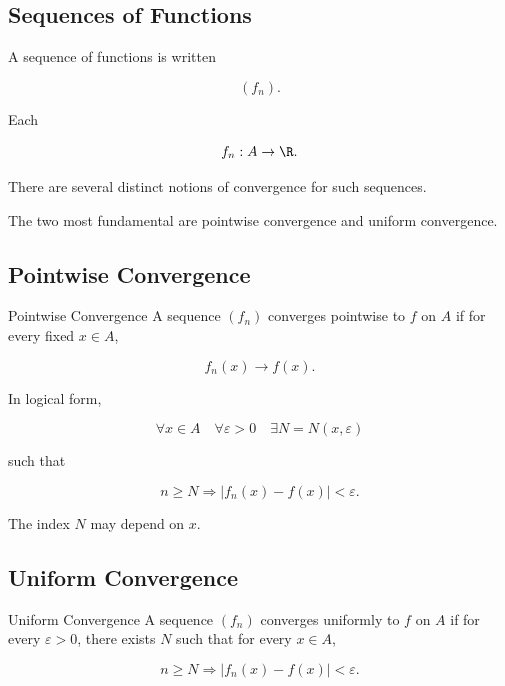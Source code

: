 \subsection{Sequences of Functions}
\label{subsec:sequences-functions}

A sequence of functions is written

\[
\boxed{
(f_n).
}
\]

Each

\[
f_n:A\to\R.
\]

There are several distinct notions of convergence for such sequences.

The two most fundamental are pointwise convergence and uniform convergence.

\subsection{Pointwise Convergence}
\label{subsec:pointwise-convergence}

\begin{definitionbox}{Pointwise Convergence}
A sequence \((f_n)\) converges pointwise to \(f\) on \(A\) if for every
fixed \(x\in A\),

\[
\boxed{
f_n(x)\to f(x).
}
\]
\end{definitionbox}

In logical form,

\[
\boxed{
\forall x\in A
\quad
\forall\varepsilon>0
\quad
\exists N=N(x,\varepsilon)
}
\]

such that

\[
n\geq N
\Longrightarrow
|f_n(x)-f(x)|<\varepsilon.
\]

The index \(N\) may depend on \(x\).

\subsection{Uniform Convergence}
\label{subsec:uniform-convergence}

\begin{definitionbox}{Uniform Convergence}
A sequence \((f_n)\) converges uniformly to \(f\) on \(A\) if for every
\(\varepsilon>0\), there exists \(N\) such that for every \(x\in A\),

\[
\boxed{
n\geq N
\Longrightarrow
|f_n(x)-f(x)|<\varepsilon.
}
\]
\end{definitionbox}

